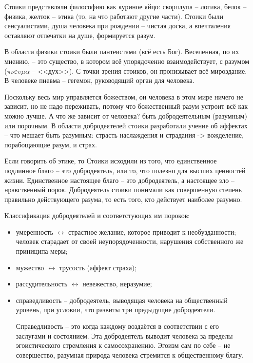 \documentclass[a4paper, 12pt]{book} %
\begin{document}
Стоики представляли философию как куриное яйцо: скорплупа -- логика, белок -- физика, желток -- этика (то, на что работают другие части). Стоики были сенсуалистами, душа человека при рождении -- чистая доска, а впечталения оставляют отпечатки на душе, формируется разум.

В области физики стоики были пантеистами (всё есть Бог). Веселенная, по их мнению, -- это существо, в котором всё упорядоченно взаимодействует, с разумом ($\pi \nu \varepsilon \upsilon \mu \alpha$ -- <<дух>>). С точки зрения стоиков, он пронизывает всё мироздание. В человеке пневма -- гегемон, руководящий орган для человека. 

Поскольку весь мир управляется божеством, он человека в этом мире ничего не зависит, но не надо переживать, потому что божественный разум устроит всё как можно лучше. А что же зависит от человека? быть добродеятельным (разумным) или порочным. В области добродеятелей стоики разработали учение об аффектах -- что мешает быть разумным: страсть наслаждения и страдания -> вожделение, порабощающие разум, и страх.

Если говорить об этике, то Стоики исходили из того, что единственное подлинное благо -- это добродеятель, или то, что полезно для высших ценностей жизни. Единственное настоящее благо -- это добродеятель, а настоящее зло -- нравственный порок. Добродеятель стоики понимали как совершенную степень правильно действующего разума, то есть того, кто действует наиболее разумно.

Классификация добродеятелей и соответстующих им пороков:
\begin{itemize}
\item умеренность $\leftrightarrow$ страстное желание, которое приводит к необузданности; человек старадает от своей неупорядоченности, нарушения собственного же приниципа меры;
\item мужество $\leftrightarrow$ трусость (аффект страха);
\item рассудительность $\leftrightarrow$ невежество, неразумие;
\item справедливость -- добродеятель, выводящая человека на общественный уровень, при условии, что развиты три предыдущие добродеятели.

Справедливость -- это когда каждому воздаётся в соответствии с его заслугами и состоянием. Эта добродеятель выводит человека за пределы эгоистического стремления к самосохранению. Эгоизм сам по себе -- не совершество, разумная природа человека стремится к общественному благу.

\end{itemize}
\end{document}
